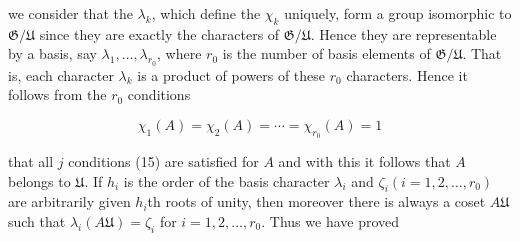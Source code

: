 we consider that the $\lambda_k$, which define the $\chi_k$ uniquely, form a group isomorphic to $\mathfrak{G}/\mathfrak{U}$ since they are exactly the characters of $\mathfrak{G}/\mathfrak{U}$. Hence they are representable by a basis, say $\lambda_1, \ldots, \lambda_{r_0}$, where $r_0$ is the number of basis elements of $\mathfrak{G}/\mathfrak{U}$. That is, each character $\lambda_k$ is a product of powers of these $r_0$ characters. Hence it follows from the $r_0$ conditions

$$\chi_1(A) = \chi_2(A) = \cdots = \chi_{r_0}(A) = 1$$

that all $j$ conditions (15) are satisfied for $A$ and with this it follows that $A$ belongs to $\mathfrak{U}$. If $h_i$ is the order of the basis character $\lambda_i$ and $\zeta_i (i = 1, 2, \ldots, r_0)$ are arbitrarily given $h_i$th roots of unity, then moreover there is always a coset $A\mathfrak{U}$ such that $\lambda_i(A\mathfrak{U}) = \zeta_i$ for $i = 1, 2, \ldots, r_0$. Thus we have proved
